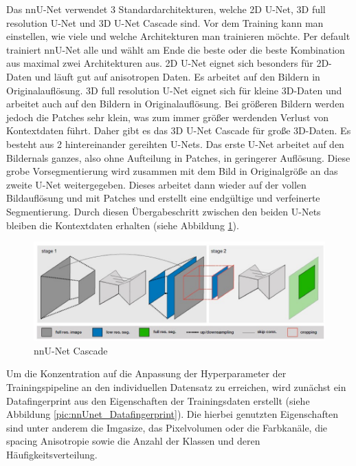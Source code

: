 Das nnU-Net verwendet 3 Standardarchitekturen, welche 2D U-Net, 3D full resolution U-Net und 3D U-Net Cascade sind. Vor dem Training kann man einstellen, wie viele und welche Architekturen man trainieren möchte. Per default trainiert nnU-Net alle und wählt am Ende die beste oder die beste Kombination aus maximal zwei Architekturen aus. 2D U-Net eignet sich besonders für 2D-Daten und läuft gut auf anisotropen Daten. Es arbeitet auf den Bildern in Originalauflösung. 3D full resolution U-Net eignet sich für kleine 3D-Daten und arbeitet auch auf den Bildern in Originalauflösung. Bei größeren Bildern werden jedoch die Patches sehr klein, was zum immer größer werdenden Verlust von Kontextdaten führt. Daher gibt es das 3D U-Net Cascade für große 3D-Daten. Es besteht aus 2 hintereinander gereihten U-Nets. Das erste U-Net arbeitet auf den Bildernals ganzes, also ohne Aufteilung in Patches, in geringerer Auflösung. Diese grobe Vorsegmentierung wird zusammen mit dem Bild in Originalgröße an das zweite U-Net weitergegeben. Dieses arbeitet dann wieder auf der vollen Bildauflösung und mit Patches und erstellt eine endgültige und verfeinerte Segmentierung. Durch diesen Übergabeschritt zwischen den beiden U-Nets bleiben die Kontextdaten erhalten (siehe Abbildung \ref{pic:nnUnet_Cascade}).

\begin{figure}[H]
	
	\centering
	\includegraphics[scale=0.8]{Pictures/nnUnet/Bild02.png}
	\caption{nnU-Net Cascade \cite{nnunetPaper} }
	\label{pic:nnUnet_Cascade}
\end{figure}


Um die Konzentration auf die Anpassung der Hyperparameter der Trainingspipeline an den individuellen Datensatz zu erreichen, wird zunächst ein Datafingerprint aus den Eigenschaften der Trainingsdaten erstellt (siehe Abbildung \ref{pic:nnUnet_Datafingerprint}). Die hierbei genutzten Eigenschaften sind unter anderem die Imgasize, das Pixelvolumen oder die Farbkanäle, die spacing Anisotropie sowie die Anzahl der Klassen und deren Häufigkeitsverteilung. 

